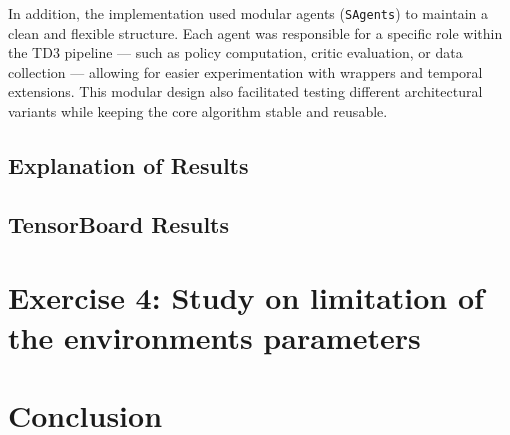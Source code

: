 \documentclass[12pt, a4paper]{article}
\begin{document}
In addition, the implementation used modular agents (\texttt{SAgents}) to maintain a clean and flexible structure. Each agent was responsible for a specific role within the TD3 pipeline — such as policy computation, critic evaluation, or data collection — allowing for easier experimentation with wrappers and temporal extensions. This modular design also facilitated testing different architectural variants while keeping the core algorithm stable and reusable.

\subsection{Explanation of Results}


\subsection{TensorBoard Results}

\section{Exercise 4: Study on limitation of the environments parameters}

\section{Conclusion}
\end{document}
